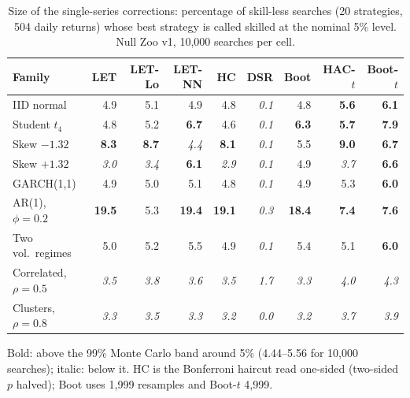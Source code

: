 \begin{table}[t]
\centering
\small
\caption{Size of the single-series corrections: percentage of skill-less searches (20 strategies, 504 daily returns) whose best strategy is called skilled at the nominal 5\% level. Null Zoo v1, 10,000 searches per cell.}
\label{tab:size-single}
\begin{tabular}{lrrrrrrrr}
\toprule
Family & LET & LET-Lo & LET-NN & HC & DSR & Boot & HAC-$t$ & Boot-$t$ \\
\midrule
IID normal & 4.9 & 5.1 & 4.9 & 4.8 & \textit{0.1} & 4.8 & \textbf{5.6} & \textbf{6.1} \\
Student $t_4$ & 4.8 & 5.2 & \textbf{6.7} & 4.6 & \textit{0.1} & \textbf{6.3} & \textbf{5.7} & \textbf{7.9} \\
Skew $-1.32$ & \textbf{8.3} & \textbf{8.7} & \textit{4.4} & \textbf{8.1} & \textit{0.1} & 5.5 & \textbf{9.0} & \textbf{6.7} \\
Skew $+1.32$ & \textit{3.0} & \textit{3.4} & \textbf{6.1} & \textit{2.9} & \textit{0.1} & 4.9 & \textit{3.7} & \textbf{6.6} \\
GARCH(1,1) & 4.9 & 5.0 & 5.1 & 4.8 & \textit{0.1} & 4.9 & 5.3 & \textbf{6.0} \\
AR(1), $\phi=0.2$ & \textbf{19.5} & 5.3 & \textbf{19.4} & \textbf{19.1} & \textit{0.3} & \textbf{18.4} & \textbf{7.4} & \textbf{7.6} \\
Two vol.\ regimes & 5.0 & 5.2 & 5.5 & 4.9 & \textit{0.1} & 5.4 & 5.1 & \textbf{6.0} \\
Correlated, $\rho=0.5$ & \textit{3.5} & \textit{3.8} & \textit{3.6} & \textit{3.5} & \textit{1.7} & \textit{3.3} & \textit{4.0} & \textit{4.3} \\
Clusters, $\rho=0.8$ & \textit{3.3} & \textit{3.5} & \textit{3.3} & \textit{3.2} & \textit{0.0} & \textit{3.2} & \textit{3.7} & \textit{3.9} \\
\bottomrule
\end{tabular}
\par\smallskip\begin{minipage}{0.97\linewidth}\footnotesize Bold: above the 99\% Monte Carlo band around 5\% (4.44--5.56 for 10,000 searches); italic: below it. HC is the Bonferroni haircut read one-sided (two-sided $p$ halved); Boot uses 1,999 resamples and Boot-$t$ 4,999.\end{minipage}
\end{table}

